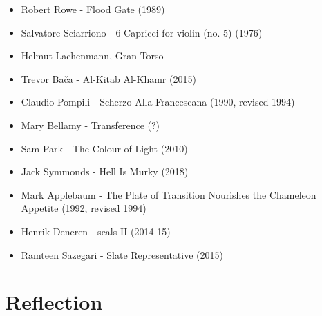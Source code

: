 \begin{itemize}
    \item Robert Rowe - Flood Gate (1989)
    \item Salvatore Sciarriono - 6 Capricci for violin (no. 5) (1976) 
    \item Helmut Lachenmann, Gran Torso
    \item Trevor Bača - Al-Kitab Al-Khamr (2015)
    \item Claudio Pompili - Scherzo Alla Francescana (1990, revised 1994)
    \item Mary Bellamy - Transference (?)
    \item Sam Park - The Colour of Light (2010)
    \item Jack Symmonds - Hell Is Murky (2018)
    \item Mark Applebaum - The Plate of Transition Nourishes the Chameleon Appetite (1992, revised 1994)
    \item Henrik Deneren - seals II (2014-15)
    \item Ramteen Sazegari - Slate Representative (2015)
\end{itemize}

\section{Reflection}




\lipsum[4]